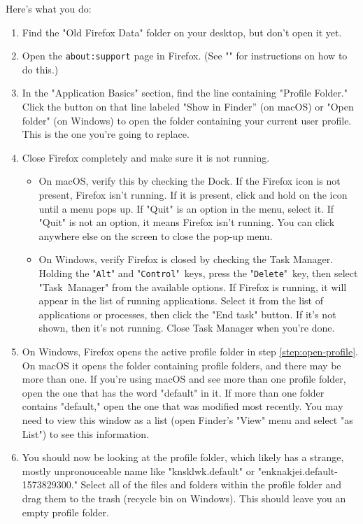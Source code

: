 \documentclass{tufte-handout}
\begin{document}
Here's what you do:
\begin{enumerate}
	\item Find the "Old Firefox Data" folder on your desktop, but don't open it yet.
	\item Open the \texttt{about:support} page in Firefox.  (See "" for instructions on how to do this.)
	\item \label{step:open-profile} In the "Application Basics" section, find the line containing "Profile Folder."  Click the button on that line labeled "Show in Finder'' (on macOS) or "Open folder" (on Windows) to open the folder containing your current user profile.  This is the one you're going to replace.
	\item Close Firefox completely and make sure it is not running.
	\begin{itemize}
		\item On macOS, verify this by checking the Dock.  If the Firefox icon is not present, Firefox isn't running.  If it is present, click and hold on the icon until a menu pops up.  If "Quit" is an option in the menu, select it.  If "Quit" is not an option, it means Firefox isn't running.  You can click anywhere else on the screen to close the pop-up menu.
		\item On Windows, verify Firefox is closed by checking the Task Manager.  Holding the "\texttt{Alt}" and "\texttt{Control}"~keys, press the "\texttt{Delete}"~key, then select "Task~Manager" from the available options.  If Firefox is running, it will appear in the list of running applications.  Select it from the list of applications or processes, then click the "End task" button.  If it's not shown, then it's not running.  Close Task Manager when you're done.
	\end{itemize}
	\item On Windows, Firefox opens the active profile folder in step \ref{step:open-profile}.  On macOS it opens the folder containing profile folders, and there may be more than one.  If you're using macOS and see more than one profile folder, open the one that has the word "default" in it.  If more than one folder contains "default," open the one that was modified most recently.  You may need to view this window as a list (open Finder's "View" menu and select "as List") to see this information.
	\item You should now be looking at the profile folder, which likely has a strange, mostly unpronouceable name like "knsklwk.default" or "enknakjei.default-1573829300."  Select all of the files and folders within the profile folder and drag them to the trash (recycle bin on Windows).  This should leave you an empty profile folder.

\end{enumerate}
\end{document}

